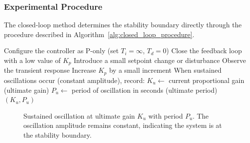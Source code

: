 \subsubsection{Experimental Procedure}

The closed-loop method determines the stability boundary directly through the procedure described in Algorithm~\ref{alg:closed_loop_procedure}.

\begin{algorithm}
\caption{Ziegler-Nichols Closed-Loop (Ultimate Gain) Procedure}
\label{alg:closed_loop_procedure}
\begin{algorithmic}[1]
\State Configure the controller as P-only (set $T_i = \infty$, $T_d = 0$)
\State Close the feedback loop with a low value of $K_p$
\State Introduce a small setpoint change or disturbance
    \State Observe the transient response
    \State Increase $K_p$ by a small increment
\EndWhile
\State When sustained oscillations occur (constant amplitude), record:
\State \quad $K_u \gets$ current proportional gain (ultimate gain)
\State \quad $P_u \gets$ period of oscillation in seconds (ultimate period)
\State \Return $(K_u, P_u)$
\end{algorithmic}
\end{algorithm}

\begin{figure}[htbp]
\centering
{}
\caption{Sustained oscillation at ultimate gain $K_u$ with period $P_u$. The oscillation amplitude remains constant, indicating the system is at the stability boundary.}
\label{fig:ultimate_oscillation}
\end{figure}

